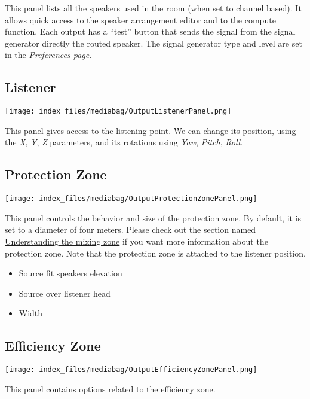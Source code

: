 \documentclass[
  letterpaper,
  DIV=11,
  numbers=noendperiod]{scrreport}
\providecommand{\tightlist}{%
  \setlength{\itemsep}{0pt}\setlength{\parskip}{0pt}}\usepackage{longtable,booktabs,array}
\begin{document}
This panel lists all the speakers used in the room (when set to channel
based). It allows quick access to the speaker arrangement editor and to
the compute function. Each output has a ``test'' button that sends the
signal from the signal generator directly the routed speaker. The signal
generator type and level are set in the
\emph{\href{Application_Preferences.md}{Preferences page}}.

\hypertarget{listener}{%
\subsection{Listener}\label{listener}}

\texttt{[image: index\_files/mediabag/OutputListenerPanel.png]}

This panel gives access to the listening point. We can change its
position, using the \emph{X}, \emph{Y}, \emph{Z} parameters, and its
rotations using \emph{Yaw}, \emph{Pitch}, \emph{Roll}.

\hypertarget{protection-zone}{%
\subsection{Protection Zone}\label{protection-zone}}

\texttt{[image: index\_files/mediabag/OutputProtectionZonePanel.png]}

This panel controls the behavior and size of the protection zone. By
default, it is set to a diameter of four meters. Please check out the
section named
\href{Spat_Environment_Understanding_the_3D_View.md}{Understanding the
mixing zone} if you want more information about the protection zone.
Note that the protection zone is attached to the listener position.

\begin{itemize}
\tightlist
\item
  Source fit speakers elevation
\item
  Source over listener head
\item
  Width
\end{itemize}

\hypertarget{efficiency-zone}{%
\subsection{Efficiency Zone}\label{efficiency-zone}}

\texttt{[image: index\_files/mediabag/OutputEfficiencyZonePanel.png]}

This panel contains options related to the efficiency zone.
\end{document}
